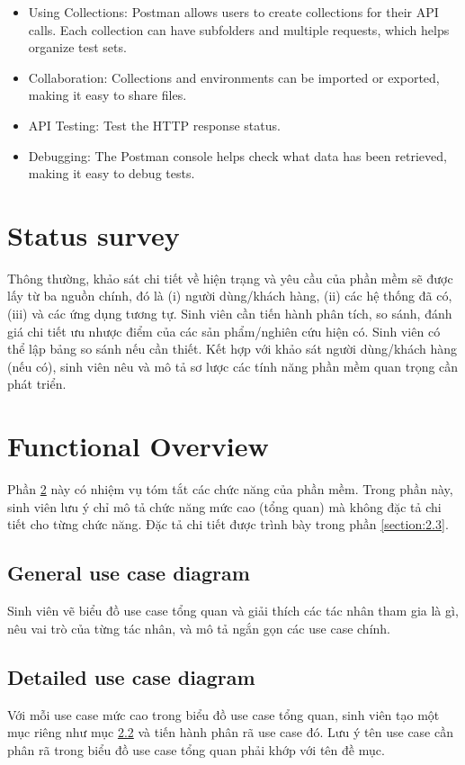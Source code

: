 \documentclass[../Main.tex]{subfiles}
\begin{document}
\begin{itemize}
    \item Using Collections: Postman allows users to create collections for their API calls.
          Each collection can have subfolders and multiple requests, which helps organize test sets.
    \item Collaboration: Collections and environments can be imported or exported, making it easy to share files.
    \item API Testing: Test the HTTP response status.
    \item Debugging: The Postman console helps check what data has been retrieved, making it easy to debug tests.
\end{itemize}

\section{Status survey}
\label{section:2.1}
Thông thường, khảo sát chi tiết về hiện trạng và yêu cầu của phần mềm sẽ được lấy từ ba nguồn chính, đó là (i) người dùng/khách hàng, (ii) các hệ thống đã có, (iii) và các ứng dụng tương tự.
Sinh viên cần tiến hành phân tích, so sánh, đánh giá chi tiết ưu nhược điểm của các sản phẩm/nghiên cứu hiện có.
Sinh viên có thể lập bảng so sánh nếu cần thiết.
Kết hợp với khảo sát người dùng/khách hàng (nếu có), sinh viên nêu và mô tả sơ lược các tính năng phần mềm quan trọng cần phát triển.

\section{Functional Overview}
\label{section:2.2}
Phần \ref{section:2.2} này có nhiệm vụ tóm tắt các chức năng của phần mềm.
Trong phần này, sinh viên lưu ý chỉ mô tả chức năng mức cao (tổng quan) mà không đặc tả chi tiết cho từng chức năng.
Đặc tả chi tiết được trình bày trong phần \ref{section:2.3}.

\subsection{General use case diagram}
\label{subsection:2.2.1}
Sinh viên vẽ biểu đồ use case tổng quan và giải thích các tác nhân tham gia là gì, nêu vai trò của từng tác nhân, và mô tả ngắn gọn các use case chính.

\subsection{Detailed use case diagram}
\label{subsection:2.2.2}
Với mỗi use case mức cao trong biểu đồ use case tổng quan, sinh viên tạo một mục riêng như mục \ref{subsection:2.2.2} và tiến hành phân rã use case đó.
Lưu ý tên use case cần phân rã trong biểu đồ use case tổng quan phải khớp với tên đề mục.
\end{document}
